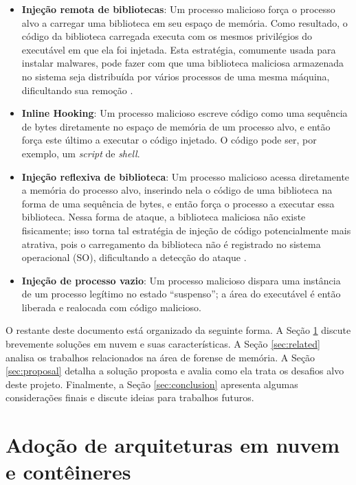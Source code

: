 \documentclass[conference]{IEEEtran}
\begin{document}
\begin{itemize}
 \item \textbf{Injeção remota de bibliotecas}: Um processo malicioso força o processo alvo a carregar uma biblioteca em seu espaço de memória.
 Como resultado, o código da biblioteca carregada executa com os mesmos privilégios do executável em que ela foi injetada. 
 Esta estratégia, comumente usada para instalar malwares, pode fazer com que uma biblioteca maliciosa armazenada no sistema seja distribuída por vários processos de uma mesma máquina, dificultando sua remoção \cite{Miller_Remote_Library_Injection:2004}.
 \item \textbf{Inline Hooking}: Um processo malicioso escreve código como uma sequência de bytes diretamente no espaço de memória de um processo alvo, e então força este último a executar o código injetado. 
 O código pode ser, por exemplo, um \textit{script} de \textit{shell}.
 \item \textbf{Injeção reflexiva de biblioteca}: Um processo malicioso acessa diretamente a memória do processo alvo, inserindo nela o código de uma biblioteca na forma de uma sequência de bytes, e então força o processo a executar essa biblioteca. 
 Nessa forma de ataque, a biblioteca maliciosa não existe fisicamente; isso torna tal estratégia de injeção de código potencialmente mais atrativa, pois o carregamento da biblioteca não é registrado no sistema operacional (SO), dificultando a detecção do ataque \cite{Fewer_Reflective_Library_Inject:2008}.
 \item \textbf{Injeção de processo vazio}: Um processo malicioso dispara uma instância de um processo legítimo no estado ``suspenso''; a área do executável é então liberada e realocada com código malicioso.
\end{itemize}


O restante deste documento está organizado da seguinte forma.
%
A Seção \ref{sec:cloud} discute brevemente soluções em nuvem e suas características.
%
A Seção \ref{sec:related} analisa os trabalhos relacionados na área de forense de memória.
%
A Seção \ref{sec:proposal} detalha a solução proposta e avalia como ela trata os desafios alvo deste projeto.
%
Finalmente, a Seção \ref{sec:conclusion} apresenta algumas considerações finais e discute ideias para trabalhos futuros.


\section{Adoção de arquiteturas em nuvem e contêineres}
\label{sec:cloud}
\end{document}
